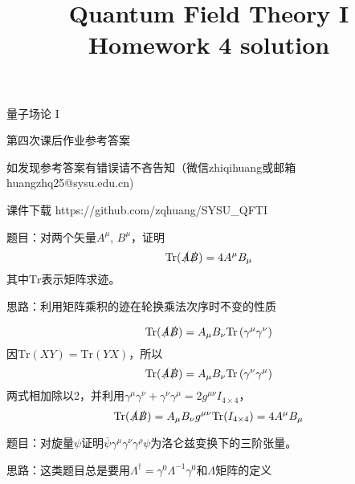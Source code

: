\documentclass[CJK]{beamer}
\title{Quantum Field Theory I \\ Homework 4 solution}
\author{}
\date{}
\begin{document}
\begin{frame}
 
\begin{center}
\begin{Large}
\bch
量子场论 I 

{\vskip 0.3in}

第四次课后作业参考答案
\skipline
\skipline

如发现参考答案有错误请不吝告知（微信zhiqihuang或邮箱huangzhq25@sysu.edu.cn)
\ech
\end{Large}
\end{center}

\vskip 0.2in

\bch
课件下载
\ech
https://github.com/zqhuang/SYSU\_QFTI

\end{frame}

\begin{frame}
\bch
题目：对两个矢量$A^\mu$, $B^\mu$，证明
$$\mathrm{Tr}(\slashed{A}\slashed{B}) = 4A^\mu B_\mu$$
其中$\mathrm{Tr}$表示矩阵求迹。


\skipline
思路：利用矩阵乘积的迹在轮换乘法次序时不变的性质
\ech
\end{frame}

\begin{frame}
\bch
$$\mathrm{Tr}(\slashed{A}\slashed{B}) = A_\mu B_\nu \mathrm{Tr}\left(\gamma^\mu\gamma^\nu\right)$$
因$\mathrm{Tr}(XY) = \mathrm{Tr}(YX)$，所以 
$$\mathrm{Tr}(\slashed{A}\slashed{B}) = A_\mu B_\nu \mathrm{Tr}\left(\gamma^\nu\gamma^\mu\right)$$
两式相加除以2，并利用$\gamma^\mu\gamma^\nu + \gamma^\nu\gamma^\mu = 2 g^{\mu\nu}I_{4\times 4}$，
$$\mathrm{Tr}(\slashed{A}\slashed{B}) = A_\mu B_\nu g^{\mu\nu} \mathrm{Tr}(I_{4\times 4}) = 4 A^\mu B_\mu$$
 
\ech
\end{frame}

\begin{frame}
\bch
题目：对旋量$\psi$证明$\bar{\psi}\gamma^\mu\gamma^\nu\gamma^\rho\psi$为洛仑兹变换下的三阶张量。


\skipline
思路：这类题目总是要用$\Lambda^\dagger = \gamma^0\Lambda^{-1}\gamma^0$和$\Lambda$矩阵的定义
\ech
\end{frame}
\end{document}
